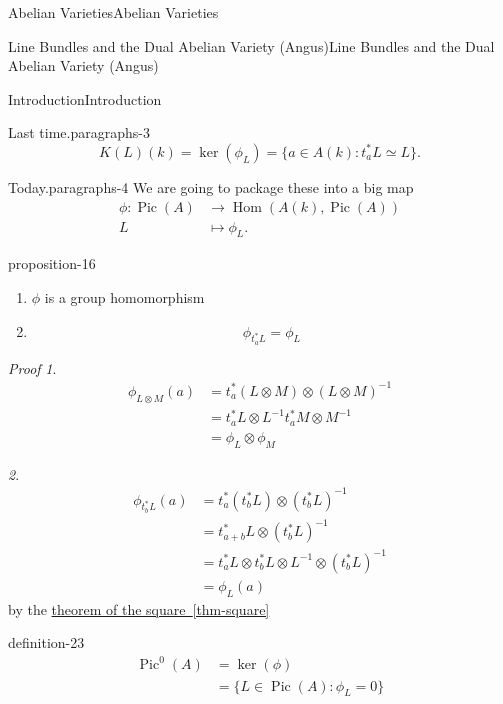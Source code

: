 \documentclass[10pt,]{book}
\makeatletter
\renewcommand*{\proofname}{Proof}
\renewenvironment{proof}[1][\proofname]{\par
  \pushQED{\qed}%
  \normalfont \topsep6\p@\@plus6\p@\relax
  \trivlist
  \item\relax
    {\itshape
    #1\@addpunct{.}}\hspace\labelsep\ignorespaces
}{%
  \popQED\endtrivlist\@endpefalse
}
\numberwithin{equation}{section}
\DeclareMathOperator{\Hom}{Hom}
\DeclareMathOperator{\Pic}{Pic}
\newcommand{\amp}{&}
\makeatother
\begin{document}
\begin{chapterptx}{Abelian Varieties}{}{Abelian Varieties}{}{}
\begin{sectionptx}{Line Bundles and the Dual Abelian Variety (Angus)}{}{Line Bundles and the Dual Abelian Variety (Angus)}{}{}
\begin{subsectionptx}{Introduction}{}{Introduction}{}{}
\begin{paragraphs}{Last time.}{paragraphs-3}
\begin{equation*}
K(L)(k) = \ker(\phi_L) = \{a\in A(k) : t_a^* L \simeq L\}\text{.}
\end{equation*}
%
\end{paragraphs}%
\begin{paragraphs}{Today.}{paragraphs-4}%
\hypertarget{p-166}{}%
We are going to package these into a big map%
\begin{align*}
\phi\colon \Pic(A)\amp\to \Hom(A(k), \Pic(A))\\
L \amp\mapsto \phi_L\text{.}
\end{align*}
%
\begin{proposition}{}{}{proposition-16}%
\hypertarget{p-167}{}%
\leavevmode%
\begin{enumerate}
\item\hypertarget{li-27}{}\(\phi\) is a group homomorphism%
\item\hypertarget{li-28}{}%
\begin{equation*}
\phi_{t_a^* L}  = \phi_L
\end{equation*}
%
\end{enumerate}
%
\end{proposition}
\begin{proof}\hypertarget{proof-32}{}
\hypertarget{case-5}{}\textit{1}. \hypertarget{p-168}{}%
%
\begin{align*}
\phi_{L\otimes M}(a) \amp = t_a^*(L\otimes M) \otimes(L\otimes M)^{-1}\\
\amp = t_a^*L\otimes L^{-1} t_a^*M\otimes M^{-1}\\
\amp = \phi_L\otimes \phi_M
\end{align*}
%
\par\medskip\noindent
\hypertarget{case-6}{}\textit{2}. \hypertarget{p-169}{}%
%
\begin{align*}
\phi_{t_b^*L}(a) \amp = t_a^*(t_b^*L) \otimes(t_b^*L)^{-1}\\
\amp = t_{a+b}^*L \otimes(t_b^*L)^{-1}\\
\amp = t_{a}^*L \otimes t_b^*L \otimes L^{-1} \otimes (t_b^*L)^{-1}\\
\amp = \phi_L(a)
\end{align*}
by  the \hyperref[thm-square]{theorem of the square~\ref{thm-square}}%
\end{proof}
\begin{definition}{}{definition-23}%
\hypertarget{p-170}{}%
%
\begin{align*}
\Pic^0(A) \amp = \ker(\phi)\\
\amp = \{ L \in \Pic(A) : \phi_L = 0\}\\

\end{align*}
\end{definition}
\end{paragraphs}
\end{subsectionptx}
\end{sectionptx}
\end{chapterptx}
\end{document}
